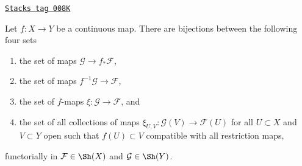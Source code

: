 \begin{lemma}[F map]
\label{sheaves-lemma-f-map}
\href{https://stacks.math.columbia.edu/tag/008K}{\texttt{Stacks tag 008K}}

Let $f : X \to Y$ be a continuous map.
There are bijections between the following four sets
\begin{enumerate}
\item the set of maps $\mathcal{G} \to f_*\mathcal{F}$,
\item the set of maps $f^{-1}\mathcal{G} \to \mathcal{F}$,
\item the set of $f$-maps $\xi : \mathcal{G} \to \mathcal{F}$, and
\item the set of all collections of maps
$\xi_{U, V} : \mathcal{G}(V) \to \mathcal{F}(U)$ for all
$U \subset X$ and $V \subset Y$ open such that $f(U) \subset V$
compatible with all restriction maps,
\end{enumerate}
functorially in $\mathcal{F} \in \Sh(X)$ and $\mathcal{G} \in \Sh(Y)$.
\end{lemma}

